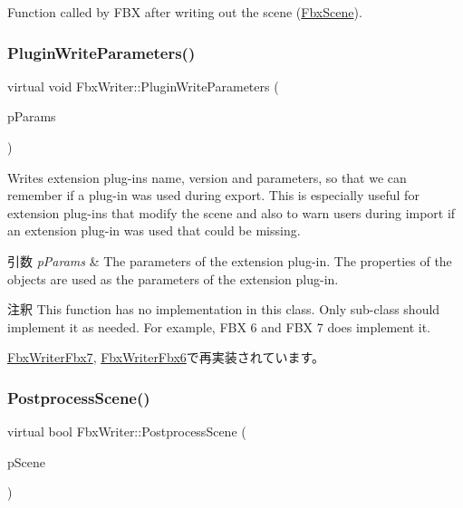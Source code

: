 Function called by F\+BX after writing out the scene (\hyperlink{class_fbx_scene}{Fbx\+Scene}). 

\mbox{\label{class_fbx_writer_a851219ad904ebdce34acd3b8699cb0c8}} 
\subsubsection{\texorpdfstring{Plugin\+Write\+Parameters()}{PluginWriteParameters()}}
{\footnotesize\ttfamily virtual void Fbx\+Writer\+::\+Plugin\+Write\+Parameters (\begin{DoxyParamCaption}\item[{\hyperlink{class_fbx_object}{Fbx\+Object} \&}]{p\+Params }\end{DoxyParamCaption})\hspace{0.3cm}{\ttfamily [virtual]}}

Writes extension plug-\/ins name, version and parameters, so that we can remember if a plug-\/in was used during export. This is especially useful for extension plug-\/ins that modify the scene and also to warn users during import if an extension plug-\/in was used that could be missing. 
\begin{DoxyParams}{引数}
{\em p\+Params} & The parameters of the extension plug-\/in. The properties of the objects are used as the parameters of the extension plug-\/in. \\
\hline
\end{DoxyParams}
\begin{DoxyRemark}{注釈}
This function has no implementation in this class. Only sub-\/class should implement it as needed. For example, F\+BX 6 and F\+BX 7 does implement it. 
\end{DoxyRemark}


\hyperlink{class_fbx_writer_fbx7_a36f757ea224bdb66cf732cb9a5a534f2}{Fbx\+Writer\+Fbx7}, \hyperlink{class_fbx_writer_fbx6_a2dd451ffa9e15aca1f5130c7334163a4}{Fbx\+Writer\+Fbx6}で再実装されています。

\mbox{\label{class_fbx_writer_a1cfdf59f72ebe777484862e4b64b5d65}} 
\subsubsection{\texorpdfstring{Postprocess\+Scene()}{PostprocessScene()}}
{\footnotesize\ttfamily virtual bool Fbx\+Writer\+::\+Postprocess\+Scene (\begin{DoxyParamCaption}\item[{\hyperlink{class_fbx_scene}{Fbx\+Scene} \&}]{p\+Scene }\end{DoxyParamCaption})\hspace{0.3cm}{\ttfamily [pure virtual]}}

